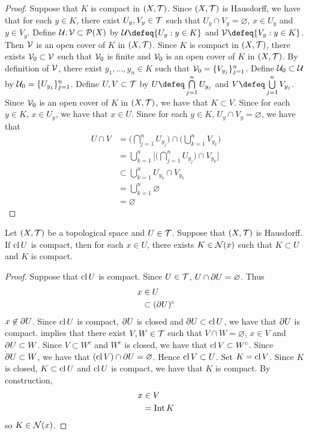 \documentclass{book}
\begin{document}
	\begin{proof}
		Suppose that $K$ is compact in $(X, \mathcal{T})$. Since $(X, \mathcal{T})$ is Hausdorff, we have that for each $y \in K$, there exist $U_y, V_y \in \mathcal{T}$ such that $U_y \cap V_y = \varnothing$, $x \in U_y$ and $y \in V_y$. Define $\mathcal{U}, \mathcal{V} \subset \mathcal{P}(X)$ by $\MU \defeq \{U_y: y \in K\}$ and $\MV \defeq \{V_y: y \in K\}$. Then $\mathcal{V}$ is an open cover of $K$ in $(X, \mathcal{T})$. Since $K$ is compact in $(X, \mathcal{T})$, there exists $\mathcal{V}_0 \subset \mathcal{V}$ such that $\mathcal{V}_0$ is finite and $\mathcal{V}_0$ is an open cover of $K$ in $(X, \mathcal{T})$. By definition of $\mathcal{V}$, there exist $y_1, \ldots, y_n \in K$ such that $\mathcal{V}_0 = \{V_{y_j}\}_{j=1}^n$. Define $\mathcal{U}_0 \subset \mathcal{U}$ by $\mathcal{U}_0 = \{U_{y_j}\}_{j=1}^n$. Define $U,V \subset \mathcal{T}$ by $U \defeq \bigcap\limits_{j=1}^n U_{y_j}$ and $V \defeq \bigcup\limits_{j=1}^n V_{y_j}$. Since $\mathcal{V}_0$ is an open cover of $K$ in $(X, \mathcal{T})$, we have that $K \subset V$. Since for each $y \in K$, $x \in U_y$, we have that $x \in U$. Since for each $y \in K$, $U_y \cap V_y = \varnothing$, we have that 
		\begin{align*}
			U \cap V
			& = \bigg( \bigcap_{j=1}^n U_{y_j} \bigg) \cap  \bigg( \bigcup_{k=1}^n V_{y_k} \bigg) \\
			& = \bigcup_{k=1}^n \bigg[ \bigg(  \bigcap_{j=1}^n U_{y_j} \bigg) \cap V_{y_k}  \bigg] \\
			& \subset \bigcup_{k=1}^n U_{y_k} \cap V_{y_k} \\
			& = \bigcup_{k=1}^n \varnothing \\
			& = \varnothing
		\end{align*}
	\end{proof}
	
	\begin{ex}
		Let $(X, \mathcal{T})$ be a topological space and $U \in \mathcal{T}$. Suppose that $(X, \mathcal{T})$ is Hausdorff. If $\operatorname{cl} U$ is compact, then for each $x \in U$, there exists $K \in \mathcal{N}(x)$ such that $K \subset U$ and $K$ is compact.   
	\end{ex}

	\begin{proof}
		Suppose that $\operatorname{cl} U$ is compact. Since $U \in \mathcal{T}$, $U \cap \partial U = \varnothing$. Thus  
		\begin{align*}
			x 
			& \in U \\
			& \subset (\partial U)^c 
		\end{align*}
		$x \not \in \partial U$. Since $\operatorname{cl} U$ is compact, $\partial U$ is closed and $\partial U \subset \operatorname{cl} U$, we have that $\partial U$ is compact.  implies that there exist $V,W \in \mathcal{T}$ such that $V \cap W = \varnothing$, $x \in V$ and $\partial U \subset W$. Since $V \subset W^c$ and $W^c$ is closed, we have that $\operatorname{cl} V \subset W^c$. Since $\partial U \subset W$, we have that $(\operatorname{cl} V) \cap \partial U = \varnothing$. Hence $\operatorname{cl} V \subset U$. Set $K = \operatorname{cl} V$. Since $K$ is closed, $K \subset \operatorname{cl} U$ and $\operatorname{cl} U$ is compact, we have that $K$ is compact. By construction,  
		\begin{align*}
			x 
			& \in V \\
			& = \operatorname{Int} K 
		\end{align*}
		so $K \in \mathcal{N}(x)$. 
	\end{proof}
\end{document}
